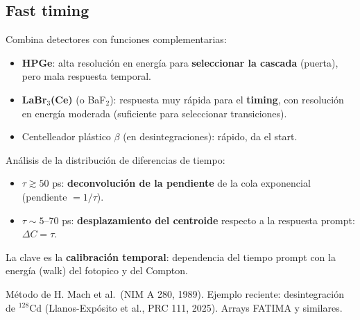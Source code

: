 \subsection{Fast timing}
\begin{clave}
Combina detectores con funciones complementarias:
\begin{itemize}
\item \textbf{HPGe}: alta resolución en energía para \textbf{seleccionar la cascada} (puerta), pero mala respuesta temporal.
\item \textbf{LaBr$_3$(Ce)} (o BaF$_2$): respuesta muy rápida para el \textbf{timing}, con resolución en energía moderada (suficiente para seleccionar transiciones).
\item Centelleador plástico $\beta$ (en desintegraciones): rápido, da el start.
\end{itemize}
Análisis de la distribución de diferencias de tiempo:
\begin{itemize}
\item $\tau\gtrsim50$ ps: \textbf{deconvolución de la pendiente} de la cola exponencial (pendiente $=1/\tau$).
\item $\tau\sim5$--70 ps: \textbf{desplazamiento del centroide} respecto a la respuesta prompt: $\Delta C=\tau$.
\end{itemize}
La clave es la \textbf{calibración temporal}: dependencia del tiempo prompt con la energía (walk) del fotopico y del Compton.
\end{clave}
\begin{dato}
Método de H. Mach et al.\ (NIM A 280, 1989). Ejemplo reciente: desintegración de $^{128}$Cd (Llanos-Expósito et al., PRC 111, 2025). Arrays FATIMA y similares.
\end{dato}
